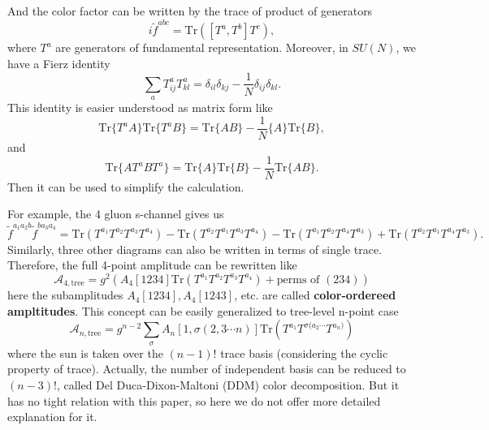 \documentclass[12pt]{article}
\numberwithin{equation}{section}
\begin{document}
And the color factor can be written by the trace of product of generators
\begin{equation}
    i\tilde{f}^{abc}=\mathrm{Tr}([T^a,T^b]T^c),
\end{equation}
where $T^a$ are generators of fundamental representation. Moreover, in $SU(N)$, we have a Fierz identity
\begin{equation}
    \sum_{a}T^a_{ij}T^a_{kl}=\delta_{il}\delta_{kj}-\frac{1}{N}\delta_{ij}\delta_{kl}.
\end{equation}
This identity is easier understood as matrix form like 
\begin{equation}
    \mathrm{Tr}\{T^aA\}\mathrm{Tr}\{T^aB\}=\mathrm{Tr}\{AB\}-\frac{1}{N}\{A\}\mathrm{Tr}\{B\},
\end{equation}
and
\begin{equation}
    \mathrm{Tr}\{AT^aBT^a\}=\mathrm{Tr}\{A\}\mathrm{Tr}\{B\}-\frac{1}{N}\mathrm{Tr}\{AB\}.
\end{equation}
Then it can be used to simplify the calculation.

For example, the 4 gluon s-channel gives us
\begin{equation}
    \tilde{f}^{a_1a_2b}\tilde{f}^{ba_3a_4}=\mathrm{Tr}(T^{a_1}T^{a_2}T^{a_3}T^{a_4})-\mathrm{Tr}(T^{a_2}T^{a_1}T^{a_3}T^{a_4})-\mathrm{Tr}(T^{a_1}T^{a_2}T^{a_4}T^{a_3})+\mathrm{Tr}(T^{a_2}T^{a_1}T^{a_4}T^{a_3}).
\end{equation}
Similarly, three other diagrams can also be written in terms of single trace. Therefore, the full 4-point amplitude can be rewritten like
\begin{equation}
    \mathcal{A}_{4,\text{tree}}=g^2(A_4[1234]\mathrm{Tr}(T^{a_1}T^{a_2}T^{a_3}T^{a_4})+\text{perms of } (234) )
\end{equation}
here the subamplitudes $A_4[1234],A_4[1243]$, etc. are called \textbf{color-ordereed ampltitudes}. This concept can be easily generalized to tree-level n-point case
\begin{equation}
    \mathcal{A}_{n,\text{tree}}=g^{n-2}\sum_{\sigma}A_n[1,\sigma(2,3\cdots n)]\mathrm{Tr}(T^{a_1}T^{\sigma(a_2\cdots}T^{a_n)})
    \label{2.29}
\end{equation}
where the sun is taken over the $(n-1)!$ trace basis (considering the cyclic property of trace). Actually, the number of independent basis can be reduced to $(n-3)!$, called Del Duca-Dixon-Maltoni (DDM) color decomposition\cite{DelDuca:1999rs}. But it has no tight relation with this paper, so here we do not offer more detailed explanation for it. 
\end{document}
